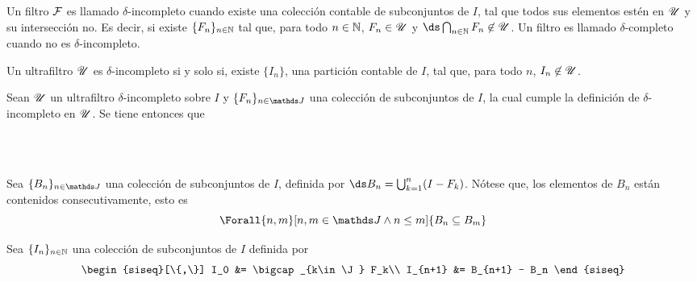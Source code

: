 \begin{definition}
  Un filtro $\mathcal{F}$ es llamado $\delta$-incompleto cuando existe una colección
  contable de subconjuntos de $I$, tal que todos sus elementos estén en $\mathscr{U}$ y
  su intersección no. Es decir, si existe $\{F_n\}_{n\in\mathbb{N}}$ tal que,
  para todo $n\in\mathbb{N}$, $F_n\in\mathscr{U}$ y $\ds\bigcap_{n\in\N}F_n \not\in \U$. Un filtro
  es llamado $\delta$-completo cuando no es $\delta$-incompleto.
\end{definition}

\begin{theorem}[Caracterización]
  Un ultrafiltro $\mathscr{U}$ es $\delta$-incompleto si y solo si, existe
  $\{I_n\}$, una partición contable de $I$, tal que, para todo $n$,
  $I_n\not\in\mathscr{U}$.
\end{theorem}

\begin{demo}
  Sean $\mathscr{U}$ un ultrafiltro $\delta$-incompleto sobre $I$ y
  $\{F_n\}_{n\in\J}$ una colección de subconjuntos de $I$, la cual
  cumple la definición de $\delta$-incompleto en $\mathscr{U}$. Se tiene
  entonces que
  \begin{longderivation}
      \\
    \\
  \end{longderivation}

  Sea $\{B_n\}_{n\in\J}$ una colección de subconjuntos de $I$, definida por
  $\ds B_n = \bigcup_{k=1}^n (I - F_k)$. Nótese que, los elementos de
  $B_n$ están contenidos consecutivamente, esto es
  \[\Forall{n,m}[n,m\in\J \land n \leq m]{B_n \subseteq B_m}\]

  Sea $\{I_n\}_{n\in\mathbb{N}}$ una colección de subconjuntos de $I$ definida por
  \[
    \begin{siseq}[\{,\}]
      I_0     &= \bigcap_{k\in\J} F_k\\
      I_{n+1} &= B_{n+1} - B_n
    \end{siseq}
  \]


\end{demo}
